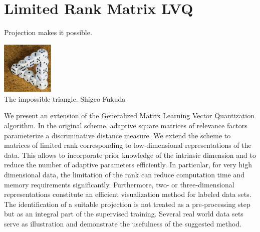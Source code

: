 

\renewcommand{\publ}{\flushleft\footnotesize{Published as:\\[0.1cm]
K. Bunte, P. Schneider, B. Hammer, F.-M. Schleif, T. Villmann and M. Biehl -- \textit{``Discriminative Visualization by Limited Rank Matrix Learning,''} Leipzig University, Machine Learning Reports (2:3), %
pp. 37--51, 2008.\\[0.1cm]
K. Bunte, P. Schneider, B. Hammer, F.-M. Schleif, T. Villmann and M. Biehl -- \textit{``Limited Rank Matrix Learning Discriminative Dimension Reduction and Visualization,''} accepted for publication in Neural Networks 2011.\\}}

\chapter{Limited Rank Matrix LVQ}
\label{chapter:LiRaMLVQ}

\epigraph{Projection makes it possible.}{\includegraphics[width=2.5cm]{pics/dice_ShigeoFukuda.eps}\\The impossible triangle. Shigeo Fukuda}



\begin{Abstract}
We present an extension of the %
Generalized Matrix Learning Vector Quantization algorithm. 
In the original scheme, adaptive square matrices of relevance factors parameterize a discriminative distance measure. 
We extend the scheme to matrices of limited rank corresponding to low-dimensional representations of the data. 
This allows to incorporate prior knowledge of the intrinsic dimension and to reduce the number of adaptive parameters efficiently. 
In particular, for very high dimensional data, the limitation of the rank can reduce computation time 
and memory requirements significantly. 
Furthermore, two- or three-dimensional representations constitute an efficient visualization method for labeled data sets. 
The identification of a suitable projection is not treated as a pre-processing step but as an integral part of the supervised training.  
Several real world data sets serve as illustration and demonstrate the usefulness of the suggested method.
\end{Abstract}

